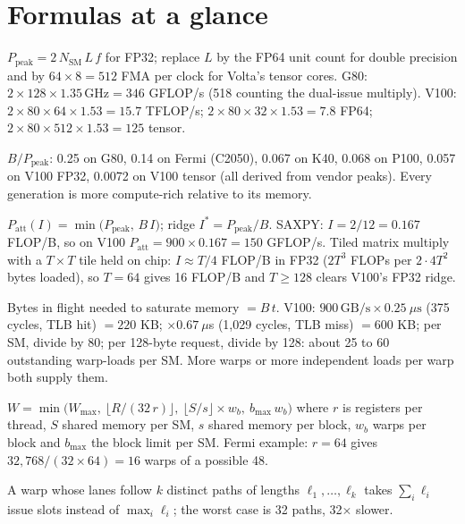 \documentclass[11pt,letterpaper]{article}
\begin{document}
\clearpage
\section{Formulas at a glance}

\begin{description}[leftmargin=0pt,labelindent=0pt,itemsep=6pt,font=\normalfont\bfseries\sffamily]\sloppy
\item[Peak arithmetic.] $P_{\text{peak}} = 2\,N_{\mathrm{SM}}\,L\,f$ for FP32; replace $L$ by the FP64 unit count for double precision and by $64\times 8 = 512$ FMA per clock for Volta's tensor cores. G80: $2\times 128\times 1.35\,\mathrm{GHz} = 346$ GFLOP/s (518 counting the dual-issue multiply). V100: $2\times 80\times 64\times 1.53 = 15.7$ TFLOP/s; $2\times 80\times 32\times 1.53 = 7.8$ FP64; $2\times 80\times 512\times 1.53 = 125$ tensor.
\item[Bytes per FLOP.] $B/P_{\text{peak}}$: 0.25 on G80, 0.14 on Fermi (C2050), 0.067 on K40, 0.068 on P100, 0.057 on V100 FP32, 0.0072 on V100 tensor (all derived from vendor peaks). Every generation is more compute-rich relative to its memory.
\item[Roofline.] $P_{\text{att}}(I) = \min\bigl(P_{\text{peak}},\, B\,I\bigr)$; ridge $I^\ast = P_{\text{peak}}/B$. SAXPY: $I = 2/12 = 0.167$ FLOP/B, so on V100 $P_{\text{att}} = 900\times 0.167 = 150$ GFLOP/s. Tiled matrix multiply with a $T\times T$ tile held on chip: $I \approx T/4$ FLOP/B in FP32 ($2T^3$ FLOPs per $2\cdot 4T^2$ bytes loaded), so $T=64$ gives 16 FLOP/B and $T\ge 128$ clears V100's FP32 ridge.
\item[Little's law for latency hiding.] Bytes in flight needed to saturate memory $= B\,t$. V100: $900\,\mathrm{GB/s}\times 0.25\ \mu\mathrm{s}$ (375 cycles, TLB hit) $= 220$ KB; $\times 0.67\ \mu$s (1{,}029 cycles, TLB miss) $= 600$ KB; per SM, divide by 80; per 128-byte request, divide by 128: about 25 to 60 outstanding warp-loads per SM. More warps or more independent loads per warp both supply them.
\item[Occupancy.] $W = \min\bigl(W_{\max},\ \lfloor R/(32\,r)\rfloor,\ \lfloor S/s\rfloor\times w_b,\ b_{\max}\,w_b\bigr)$ where $r$ is registers per thread, $S$ shared memory per SM, $s$ shared memory per block, $w_b$ warps per block and $b_{\max}$ the block limit per SM. Fermi example: $r = 64$ gives $32{,}768/(32\times 64) = 16$ warps of a possible 48.
\item[Divergence cost.] A warp whose lanes follow $k$ distinct paths of lengths $\ell_1,\dots,\ell_k$ takes $\sum_i \ell_i$ issue slots instead of $\max_i \ell_i$; the worst case is 32 paths, 32$\times$ slower.

\end{description}
\end{document}
